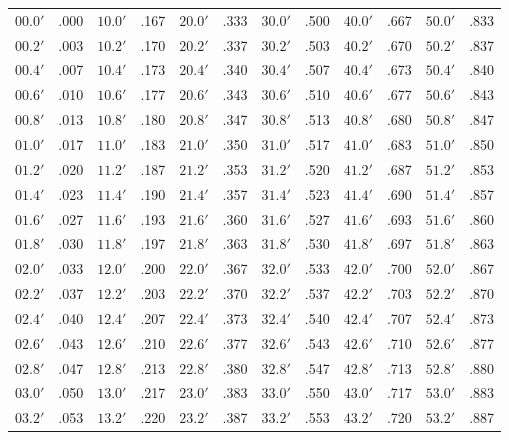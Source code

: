 \clearpage
\begin{table}[!h]\centering
\vspace{0.25cm}
{\small\begin{tabular}{ll|ll|ll|ll|ll|ll}
$00.0'$ & .000 & $10.0'$ & .167 & $20.0'$ & .333 & $30.0'$ & .500 & $40.0'$ & .667 & $50.0'$ & .833\\
$00.2'$ & .003 & $10.2'$ & .170 & $20.2'$ & .337 & $30.2'$ & .503 & $40.2'$ & .670 & $50.2'$ & .837\\
$00.4'$ & .007 & $10.4'$ & .173 & $20.4'$ & .340 & $30.4'$ & .507 & $40.4'$ & .673 & $50.4'$ & .840\\
$00.6'$ & .010 & $10.6'$ & .177 & $20.6'$ & .343 & $30.6'$ & .510 & $40.6'$ & .677 & $50.6'$ & .843\\
$00.8'$ & .013 & $10.8'$ & .180 & $20.8'$ & .347 & $30.8'$ & .513 & $40.8'$ & .680 & $50.8'$ & .847\\
$01.0'$ & .017 & $11.0'$ & .183 & $21.0'$ & .350 & $31.0'$ & .517 & $41.0'$ & .683 & $51.0'$ & .850\\
$01.2'$ & .020 & $11.2'$ & .187 & $21.2'$ & .353 & $31.2'$ & .520 & $41.2'$ & .687 & $51.2'$ & .853\\
$01.4'$ & .023 & $11.4'$ & .190 & $21.4'$ & .357 & $31.4'$ & .523 & $41.4'$ & .690 & $51.4'$ & .857\\
$01.6'$ & .027 & $11.6'$ & .193 & $21.6'$ & .360 & $31.6'$ & .527 & $41.6'$ & .693 & $51.6'$ & .860\\
$01.8'$ & .030 & $11.8'$ & .197 & $21.8'$ & .363 & $31.8'$ & .530 & $41.8'$ & .697 & $51.8'$ & .863\\
$02.0'$ & .033 & $12.0'$ & .200 & $22.0'$ & .367 & $32.0'$ & .533 & $42.0'$ & .700 & $52.0'$ & .867\\
$02.2'$ & .037 & $12.2'$ & .203 & $22.2'$ & .370 & $32.2'$ & .537 & $42.2'$ & .703 & $52.2'$ & .870\\
$02.4'$ & .040 & $12.4'$ & .207 & $22.4'$ & .373 & $32.4'$ & .540 & $42.4'$ & .707 & $52.4'$ & .873\\
$02.6'$ & .043 & $12.6'$ & .210 & $22.6'$ & .377 & $32.6'$ & .543 & $42.6'$ & .710 & $52.6'$ & .877\\
$02.8'$ & .047 & $12.8'$ & .213 & $22.8'$ & .380 & $32.8'$ & .547 & $42.8'$ & .713 & $52.8'$ & .880\\
$03.0'$ & .050 & $13.0'$ & .217 & $23.0'$ & .383 & $33.0'$ & .550 & $43.0'$ & .717 & $53.0'$ & .883\\
$03.2'$ & .053 & $13.2'$ & .220 & $23.2'$ & .387 & $33.2'$ & .553 & $43.2'$ & .720 & $53.2'$ & .887\\

\end{tabular}}
\end{table}
